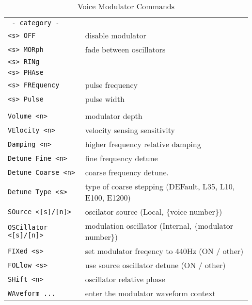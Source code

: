    \begin{table}[h]
      \caption{Voice Modulator Commands}
      \label{table:yoshimi_part_addsynth_voice_modulator_commands}
      \begin{tabular}{l l}

\texttt{ - category - } &
  \\
\texttt{<s> OFF} &
   disable modulator\\
\texttt{<s> MORph} &
   fade between oscillators\\
\texttt{<s> RINg} &
  \\
\texttt{<s> PHAse} &
  \\
\texttt{<s> FREquency} &
   pulse frequency\\
\texttt{<s> Pulse} &
   pulse width\\
\texttt{} &
   \\ %
\texttt{Volume <n>} &
   modulator depth  \\
\texttt{VElocity <n>} &
   velocity sensing sensitivity \\
\texttt{Damping <n>} &
   higher frequency relative damping \\
\texttt{Detune Fine <n>} &
   fine frequency detune \\
\texttt{Detune Coarse <n>} &
   coarse frequency detune. \\
\texttt{Detune Type <s>} &
   type of coarse stepping (DEFault, L35, L10, E100, E1200) \\
\texttt{SOurce <[s]/[n]>} &
    oscilator source (Local, \{voice number\}) \\
\texttt{OSCillator <[s]/[n]>} &
   modulation oscillator (Internal, \{modulator number\}) \\
\texttt{FIXed <s>} &
   set modulator freqency to 440Hz (ON / other) \\
\texttt{FOLlow <s>} &
   use source oscillator detune (ON / other) \\
\texttt{SHift <n>} &
   oscillator relative phase \\
\texttt{WAveform ...} &
   enter the modulator waveform context \\
      \end{tabular}
   \end{table}

